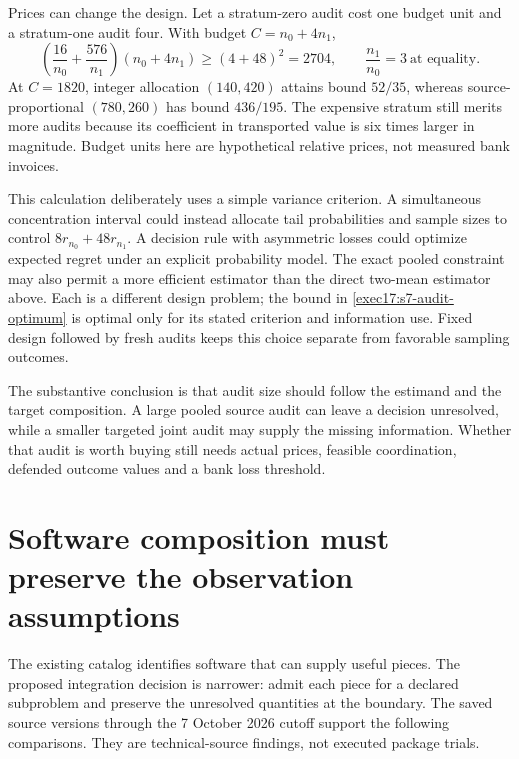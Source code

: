 Prices can change the design. Let a stratum-zero audit cost one budget unit
and a stratum-one audit four. With budget $C=n_0+4n_1$,
\begin{equation}
 \left(\frac{16}{n_0}+\frac{576}{n_1}\right)(n_0+4n_1)
 \geq(4+48)^2=2704,
 \qquad \frac{n_1}{n_0}=3\ \text{at equality}.
 \label{exec17:s7-priced-optimum}
\end{equation}
At $C=1820$, integer allocation $(140,420)$ attains bound $52/35$, whereas
source-proportional $(780,260)$ has bound $436/195$. The expensive stratum
still merits more audits because its coefficient in transported value is six
times larger in magnitude. Budget units here are hypothetical relative prices,
not measured bank invoices.

This calculation deliberately uses a simple variance criterion. A simultaneous
concentration interval could instead allocate tail probabilities and sample
sizes to control $8r_{n_0}+48r_{n_1}$. A decision rule with asymmetric losses
could optimize expected regret under an explicit probability model. The exact
pooled constraint may also permit a more efficient estimator than the direct
two-mean estimator above. Each is a different design problem; the bound in
\eqref{exec17:s7-audit-optimum} is optimal only for its stated criterion and
information use. Fixed design followed by fresh audits keeps this choice
separate from favorable sampling outcomes.

The substantive conclusion is that audit size should follow the estimand and
the target composition. A large pooled source audit can leave a decision
unresolved, while a smaller targeted joint audit may supply the missing
information. Whether that audit is worth buying still needs actual prices,
feasible coordination, defended outcome values and a bank loss threshold.

\section{Software composition must preserve the observation assumptions}
\label{exec17:s7-software}

The existing catalog identifies software that can supply useful pieces.
The proposed integration decision is narrower: admit each piece for a
declared subproblem and preserve the unresolved quantities at the boundary.
The saved source versions through the 7 October 2026 cutoff support the
following comparisons. They are technical-source findings, not executed
package trials.~\citep{exec17_s7_paths}

